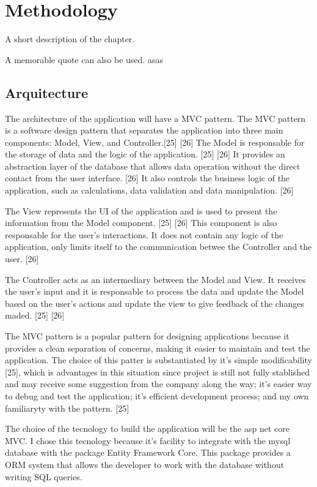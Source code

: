 \chapter{Methodology}%
\label{chapter:methodology}

\begin{introduction}
A short description of the chapter.

A memorable quote can also be used. asas
\end{introduction} 


\section{Arquitecture}

The architecture of the application will have a \ac{MVC} pattern. 
The \ac{MVC} pattern is a software design pattern that separates the application into three main components: Model, View, and Controller.[25] [26]
The Model is responsable for the storage of data and the logic of the application.  [25] [26]
It provides an abstraction layer of the database that allows data operation without the direct contact from the user interface. [26]
It also controls the business logic of the application, such as calculations, data validation and data manipulation. [26]

The View represents the \ac{UI} of the application and is used to present the information from the Model component. [25] [26]
This component is also responsable for the user's interactions. 
It does not contain any logic of the application, only limits itself to the communication betwee the Controller and the user. [26]

The Controller acts as an intermediary between the Model and View.
It receives the user's input and it is responsable to process the data and update the Model based on the user's actions and update the view to give feedback of the changes maded. [25] [26]

The \ac{MVC} pattern is a popular pattern for designing applications because it provides a clean separation of concerns, making it easier to maintain and test the application.
The choice of this patter is substantiated by it's simple modificability [25], which is advantages in this situation since project is still not fully stablished and may receive some suggestion from the company along the way;
it's easier way to debug and test the application; it's efficient development process; and my own familiaryty with the pattern. [25]

The choice of the tecnology to build the application will be the asp net core \ac{MVC}. 
I chose this tecnology because it's facility to integrate with the mysql database with the package Entity Framework Core. 
This package provides a \ac{ORM} system that allows the developer to work with the database without writing SQL queries. 

